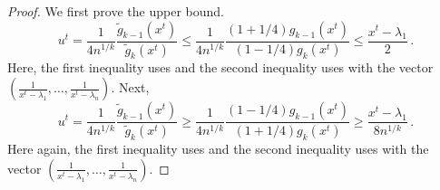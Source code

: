 \documentclass{article}[12pt]
\theoremstyle{definition}
\renewcommand{\leq}{\leqslant}
\renewcommand{\geq}{\geqslant}
\newcommand{\mper}{\,.}
\newcommand{\paren}[1]{\left(#1 \right )}
\newcommand{\mom}{g}
\newcommand{\tg}{\tilde{g}}
\newcommand{\ut}{u^t}
\begin{document}
\begin{proof}
We first prove the upper bound.
\[ \ut = \frac{1}{4 n^{1/k}}  \frac{ \tg_{k-1}(x^t)}{ \tg_k(x^t)}
\leq  \frac{1}{4n^{1/k}} \frac{(1 + 1/4) \mom_{k-1}(x^t)}{ (1 - 1/4) \mom_k(x^t)}
\leq \frac{x^t - \lambda_1}{2} \mper  \]
Here, the first inequality uses   
and the second inequality uses 
with the vector $\paren{ \frac{1}{x^t-\lambda_1}, \ldots, \frac{1}{x^t-\lambda_n} }$.
Next,
\[ \ut = \frac{1}{4n^{1/k}}  \frac{ \tg_{k-1}(x^t)}{ \tg_k(x^t)} 
\geq \frac{1}{4 n^{1/k}} \frac{ (1 - 1/4) \mom_{k-1}(x^t)  }{ (1 + 1/4) \mom_k(x^t) }
\geq \frac{ x^t - \lambda_1 }{8 n^{1/k} } \mper  \]
Here again, the first inequality uses  
and the second inequality uses 
with the vector $\paren{ \frac{1}{x^t-\lambda_1}, \ldots, \frac{1}{x^t-\lambda_n} }$.

\end{proof}
\end{document}
